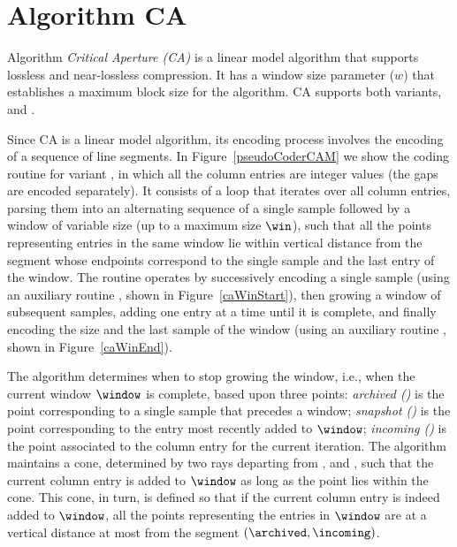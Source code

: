 
\clearpage

\section{Algorithm CA}
\label{algo:ca}


Algorithm \textit{Critical Aperture (CA)} \cite{coder:ca} is a linear model algorithm that supports lossless and near-lossless compression. It has a window size parameter ($w$) that establishes a maximum block size for the algorithm. CA supports both variants, \maskalgo and \NOmaskalgo.


Since CA is a linear model algorithm, its encoding process involves the encoding of a sequence of line segments. In Figure~\ref{pseudoCoderCAM} we show the coding routine for variant \maskalgo, in which all the column entries are integer values (the gaps are encoded separately). It consists of a loop that iterates over all column entries, parsing them into an alternating sequence of a single sample followed by a window of variable size (up to a maximum size $\win$), such that all the points representing entries in the same window lie within vertical distance \maxerror from the segment whose endpoints correspond to the single sample and the last entry of the window. The routine operates by successively encoding a single sample (using an auxiliary routine \CAWinStart, shown in Figure~\ref{caWinStart}), then growing a window of subsequent samples, adding one entry at a time until it is complete, and finally encoding the size and the last sample of the window (using an auxiliary routine \CAWinEnd, shown in Figure~\ref{caWinEnd}).





\clearpage








The algorithm determines when to stop growing the window, i.e., when the current window $\window$ is complete, based upon three points: \textit{archived (\archived)} is the point corresponding to a single sample that precedes a window; \textit{snapshot (\snapshot)} is the point corresponding to the entry most recently added to $\window$; \textit{incoming (\incoming)} is the point associated to the column entry for the current iteration. The algorithm maintains a cone, determined by two rays departing from \archived, \smin and \smax, such that the current column entry is added to $\window$ as long as the point \incoming lies within the cone. This cone, in turn, is defined so that if the current column entry is indeed added to $\window$, all the points representing the entries in $\window$ are at a vertical distance at most \maxerror from the segment $(\archived, \incoming)$.


